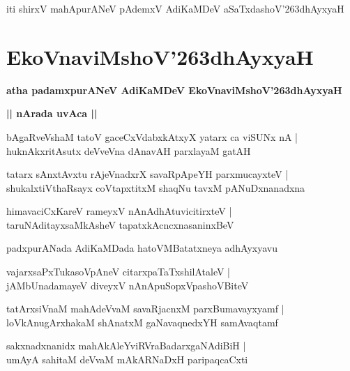 \documentclass[twoside,12pt,openright]{book}
\def\S{\char'263}
\newcounter{shloka}[chapter]
\def\uvaca#1{\centerline{{\large\textbf{#1}}}}
\begin{document}
\begin{center}
iti shirxV mahApurANeV pAdemxV AdiKaMDeV aSaTxdashoV\S dhAyxyaH 
\end{center}

\chapter{EkoVnaviMshoV\S dhAyxyaH}

\begin{center}
{\LARGE\bfseries atha padamxpurANeV AdiKaMDeV EkoVnaviMshoV\S dhAyxyaH}
\end{center}

\uvaca{|| nArada uvAca ||}

\begin{shloka}
bAgaRveVshaM tatoV gaceCxVdabxkAtxyX yatarx ca viSUNx nA |\\
huknAkxritAsutx deVveVna dAnavAH parxlayaM gatAH  
\end{shloka}

\begin{shloka}
tatarx sAnxtAvxtu rAjeVnadxrX savaRpApeYH parxmucayxteV |\\
shukalxtiVthaRsayx coVtapxtitxM shaqNu tavxM pANuDxnanadxna
\end{shloka}

\begin{shloka}
himavaciCxKareV rameyxV nAnAdhAtuvicitirxteV |\\
taruNAditayxsaMkAsheV tapatxkAcncxnasaninxBeV 
\end{shloka}

\begin{center}
padxpurANada AdiKaMDada hatoVMBatatxneya adhAyxyavu 
\end{center}

\begin{shloka}
vajarxsaPxTukasoVpAneV citarxpaTaTxshilAtaleV |\\
jAMbUnadamayeV diveyxV nAnApuSopxVpashoVBiteV 
\end{shloka}

\begin{shloka}
tatArxsiVnaM mahAdeVvaM savaRjacnxM parxBumavayxyamf |\\
loVkAnugArxhakaM shAnatxM gaNavaqnedxYH samAvaqtamf 
\end{shloka}

\begin{shloka}
sakxnadxnanidx mahAkAleYviRVraBadarxgaNAdiBiH |\\
umAyA sahitaM deVvaM mAkARNaDxH paripaqcaCxti 
\end{shloka}
\end{document}
